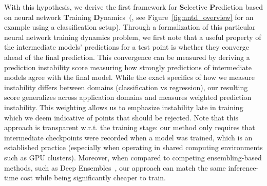 With this hypothesis, we derive the first framework for \textbf{S}elective \textbf{P}rediction based on neural network \textbf{T}raining \textbf{D}ynamics~(\sptd, see Figure~\ref{fig:nntd_overview} for an example using a classification setup). Through a formalization of this particular neural network training dynamics problem, we first note that a useful property of the intermediate models' predictions for a test point is whether they converge ahead of the final prediction. This convergence can be measured by deriving a prediction instability score measuring how strongly predictions of intermediate models agree with the final model. While the exact specifics of how we measure instability differs between domains (classification vs regression), our resulting score generalizes across application domains and measures weighted prediction instability. This weighting allows us to emphasize instability late in training which we deem indicative of points that should be rejected. Note that this approach is transparent w.r.t. the training stage: our method only requires that intermediate checkpoints were recorded when a model was trained, which is an established practice (especially when operating in shared computing environments such as GPU clusters). Moreover, when compared to competing ensembling-based methods, such as Deep Ensembles~\citep{balaji2017uncertainty}, our approach can match the same inference-time cost while being significantly cheaper to train.





